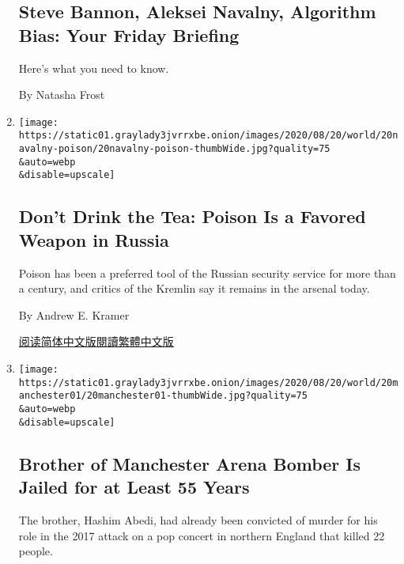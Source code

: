 \begin{enumerate}
{  \subsection{Steve Bannon, Aleksei Navalny, Algorithm Bias: Your Friday
  Briefing}\label{steve-bannon-aleksei-navalny-algorithm-bias-your-friday-briefing}}

  Here's what you need to know.

  By Natasha Frost
\item
  \href{/2020/08/20/world/europe/navalny-poison-russia-kremlin.html}{}

  \texttt{[image: https://static01.graylady3jvrrxbe.onion/images/2020/08/20/world/20navalny-poison/20navalny-poison-thumbWide.jpg?quality=75\\\&auto=webp\\\&disable=upscale]}

  \hypertarget{dont-drink-the-tea-poison-is-a-favored-weapon-in-russia}{%
  \subsection{Don't Drink the Tea: Poison Is a Favored Weapon in
  Russia}\label{dont-drink-the-tea-poison-is-a-favored-weapon-in-russia}}

  Poison has been a preferred tool of the Russian security service for
  more than a century, and critics of the Kremlin say it remains in the
  arsenal today.

  By Andrew E. Kramer

  \href{https://cn.nytimes3xbfgragh.onion/world/20200821/navalny-poison-russia-kremlin/}{阅读简体中文版}\href{https://cn.nytimes3xbfgragh.onion/world/20200821/navalny-poison-russia-kremlin/zh-hant/}{閱讀繁體中文版}
\item
  \href{/2020/08/20/world/europe/manchester-area-attack-hashim-abedi.html}{}

  \texttt{[image: https://static01.graylady3jvrrxbe.onion/images/2020/08/20/world/20manchester01/20manchester01-thumbWide.jpg?quality=75\\\&auto=webp\\\&disable=upscale]}

  \hypertarget{brother-of-manchester-arena-bomber-is-jailed-for-at-least-55-years}{%
  \subsection{Brother of Manchester Arena Bomber Is Jailed for at Least
  55
  Years}\label{brother-of-manchester-arena-bomber-is-jailed-for-at-least-55-years}}

  The brother, Hashim Abedi, had already been convicted of murder for
  his role in the 2017 attack on a pop concert in northern England that
  killed 22 people.


\end{enumerate}
